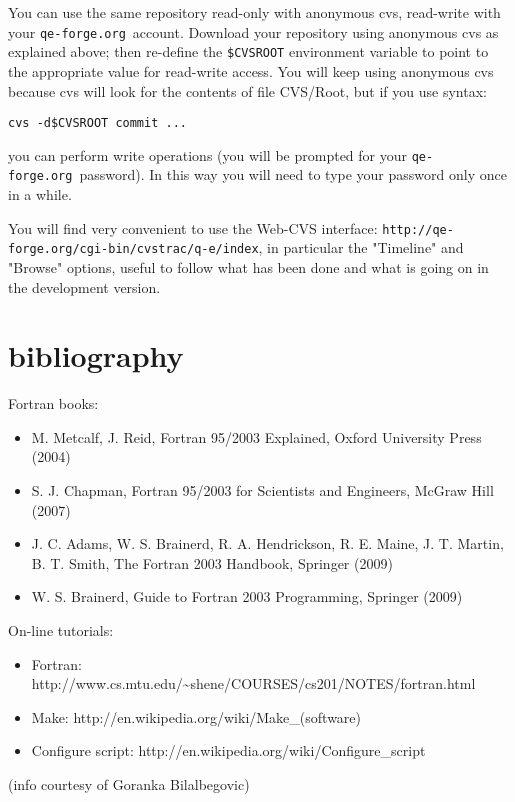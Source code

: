\documentclass[12pt,a4paper]{article}
\def\qeforge{\texttt{qe-forge.org}}
\begin{document}
You can use the same repository read-only with anonymous cvs,
read-write with your \qeforge\ account. Download your repository 
using anonymous cvs as explained above; then re-define the
\texttt{\$CVSROOT} environment variable to point to the
appropriate value for read-write access. You will keep
using anonymous cvs because cvs will look for the contents of
file CVS/Root, but if you use syntax:
\begin{verbatim}
cvs -d$CVSROOT commit ...
\end{verbatim}
you can perform write operations (you will be prompted for your 
\qeforge\ password). In this way you will need to type 
your password only once in a while.

You will find very convenient to use the Web-CVS interface:
\texttt{http://qe-forge.org/cgi-bin/cvstrac/q-e/index}, in particular the 
"Timeline" and "Browse" options, useful to follow what
has been done and what is going on in the development version.

\section{bibliography}

Fortran books:
\begin{itemize}
\item 
M. Metcalf, J. Reid, Fortran 95/2003 Explained, Oxford University Press (2004) 
\item
S. J. Chapman, Fortran 95/2003 for Scientists and Engineers, McGraw Hill (2007) 
\item
J. C. Adams, W. S. Brainerd, R. A. Hendrickson, R. E. Maine, J. T. Martin,
B. T. Smith, The Fortran 2003 Handbook, Springer (2009) 
\item
W. S. Brainerd, Guide to Fortran 2003 Programming, Springer (2009)
\end{itemize}
On-line tutorials:
\begin{itemize}
\item Fortran:
http://www.cs.mtu.edu/\~{}shene/COURSES/cs201/NOTES/fortran.html
\item Make:  
http://en.wikipedia.org/wiki/Make\_(software)
\item Configure script:
http://en.wikipedia.org/wiki/Configure\_script
\end{itemize}
(info courtesy of Goranka Bilalbegovic)
\end{document}
